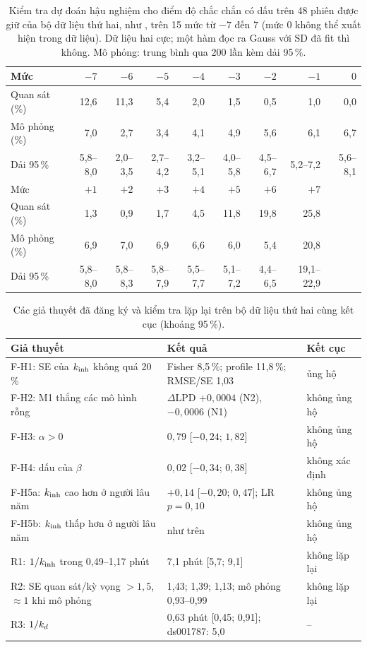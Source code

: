 \begin{table}[H]
\centering\footnotesize
\caption{Kiểm tra dự đoán hậu nghiệm cho điểm độ chắc chắn có dấu trên 48 phiên được giữ của bộ dữ liệu thứ hai, như , trên 15 mức từ $-7$ đến $7$ (mức 0 không thể xuất hiện trong dữ liệu). Dữ liệu hai cực; một hàm đọc ra Gauss với SD đã fit thì không. Mô phỏng: trung bình qua 200 lần kèm dải 95\,\%.}
\label{tab:osf-ppc}
\setlength{\tabcolsep}{3pt}
\begin{tabular}{lrrrrrrrr}
\toprule
Mức & $-7$ & $-6$ & $-5$ & $-4$ & $-3$ & $-2$ & $-1$ & $0$ \\
\midrule
Quan sát (\%)  & 12,6 & 11,3 & 5,4 & 2,0 & 1,5 & 0,5 & 1,0 & 0,0 \\
Mô phỏng (\%)  & 7,0 & 2,7 & 3,4 & 4,1 & 4,9 & 5,6 & 6,1 & 6,7 \\
Dải 95\,\%     & 5,8--8,0 & 2,0--3,5 & 2,7--4,2 & 3,2--5,1 & 4,0--5,8 & 4,5--6,7 & 5,2--7,2 & 5,6--8,1 \\
\midrule
Mức & $+1$ & $+2$ & $+3$ & $+4$ & $+5$ & $+6$ & $+7$ & \\
\midrule
Quan sát (\%)  & 1,3 & 0,9 & 1,7 & 4,5 & 11,8 & 19,8 & 25,8 & \\
Mô phỏng (\%)  & 6,9 & 7,0 & 6,9 & 6,6 & 6,0 & 5,4 & 20,8 & \\
Dải 95\,\%     & 5,8--8,0 & 5,8--8,3 & 5,8--7,9 & 5,5--7,7 & 5,1--7,2 & 4,4--6,5 & 19,1--22,9 & \\
\bottomrule
\end{tabular}
\end{table}

\begin{table}[H]
\centering\footnotesize
\caption{Các giả thuyết đã đăng ký và kiểm tra lặp lại trên bộ dữ liệu thứ hai cùng kết cục (khoảng 95\,\%).}
\label{tab:osf-tests}
\scriptsize\setlength{\tabcolsep}{3pt}
\begin{tabular}{lll}
\toprule
Giả thuyết & Kết quả & Kết cục \\
\midrule
F-H1: SE của $k_{\mathrm{inh}}$ không quá 20\,\% & Fisher 8,5\,\%; profile 11,8\,\%; RMSE/SE 1,03 & ủng hộ \\
F-H2: M1 thắng các mô hình rỗng & $\Delta$LPD $+0{,}0004$ (N2), $-0{,}0006$ (N1) & không ủng hộ \\
F-H3: $\alpha>0$ & $0{,}79$ [$-0{,}24$; $1{,}82$] & không ủng hộ \\
F-H4: dấu của $\beta$ & $0{,}02$ [$-0{,}34$; $0{,}38$] & không xác định \\
F-H5a: $k_{\mathrm{inh}}$ cao hơn ở người lâu năm & $+0{,}14$ [$-0{,}20$; $0{,}47$]; LR $p=0{,}10$ & không ủng hộ \\
F-H5b: $k_{\mathrm{inh}}$ thấp hơn ở người lâu năm & như trên & không ủng hộ \\
R1: $1/k_{\mathrm{inh}}$ trong 0,49--1,17 phút & 7,1 phút [5,7; 9,1] & không lặp lại \\
R2: SE quan sát/kỳ vọng $>1{,}5$, $\approx1$ khi mô phỏng & 1,43; 1,39; 1,13; mô phỏng 0,93--0,99 & không lặp lại \\
R3: $1/k_{d}$ & 0,63 phút [0,45; 0,91]; ds001787: 5,0 & -- \\
\bottomrule
\end{tabular}
\end{table}

